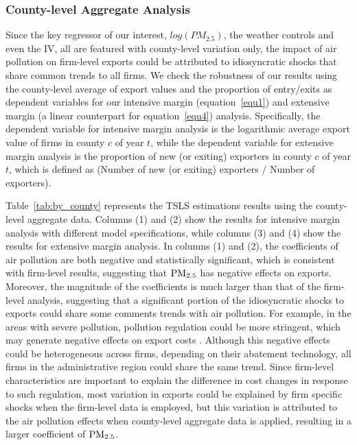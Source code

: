 \documentclass[12pt]{article}
\begin{document}
 \subsubsection{County-level Aggregate Analysis}
 Since the key regressor of our interest, $log(PM_{2.5})$, the weather controls and even the IV, all are featured with county-level variation only, the impact of air pollution on firm-level exports could be attributed to idiosyncratic shocks that share common trends to all firms. We check the robustness of our results using the county-level average of export values and the proportion of entry/exits as dependent variables for our intensive margin (equation~\ref{equ1}) and extensive margin (a linear counterpart for equation~\ref{equ4}) analysis. Specifically, the dependent variable for intensive margin analysis is the logarithmic average export value of firms in county $c$ of year $t$, while the dependent variable for extensive margin analysis is the proportion of new (or exiting) exporters in county $c$ of year $t$, which is defined as (Number of new (or exiting) exporters / Number of exporters).
 
 Table~\ref{tab:by_county} represents the TSLS estimations results using the county-level aggregate data. Columns (1) and (2) show the results for intensive margin analysis with different model specifications, while columns (3) and (4) show the results for extensive margin analysis. In columns (1) and (2), the coefficients of air pollution are both negative and statistically significant, which is consistent with firm-level results, suggesting that $\rm PM_{2.5}$ has negative effects on exports. Moreover, the magnitude of the coefficients is much larger than that of the firm-level analysis, suggesting that a significant portion of the idiosyncratic shocks to exports could share some comments trends with air pollution. For example, in the areas with severe pollution, pollution regulation could be more stringent, which may generate negative effects on export costs \citep{cherniwchan2022environmental}. Although this negative effects could be heterogeneous across firms, depending on their abatement technology, all firms in the administrative region could share the same trend. Since firm-level characteristics are important to explain the difference in cost changes in response to such regulation, most variation in exports could be explained by firm specific shocks when the firm-level data is employed, but this variation is attributed to the air pollution effects when county-level aggregate data is applied, resulting in a larger coefficient of $\rm PM_{2.5}$.
 
\end{document}
